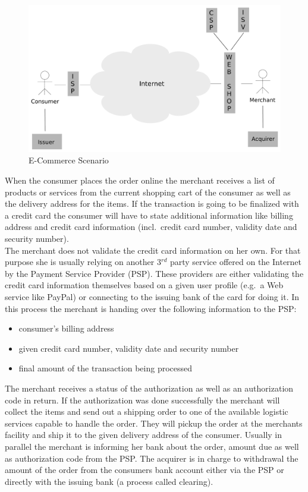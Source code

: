 \begin{figure}[H]
	\centering
		\includegraphics[width=0.8\columnwidth]{images/e-commerce-scenario.pdf}
	\caption{E-Commerce Scenario}
\label{fig:images_ecommerce_scenario}
\end{figure}

When the consumer places the order online the merchant receives a list of products or services from the current shopping cart of the consumer as well as the delivery address for the items. If the transaction is going to be finalized with a credit card the consumer will have to state additional information like billing address and credit card information (incl.\ credit card number, validity date and security number). \\
The merchant does not validate the credit card information on her own. For that purpose she is usually relying on another 3$^{rd}$ party service offered on the Internet by the Payment Service Provider (PSP). These providers are either validating the credit card information themselves based on a given user profile (e.g.\ a Web service like PayPal) or connecting to the issuing bank of the card for doing it. In this process the merchant is handing over the following information to the PSP:\@

\begin{itemize}
    \item consumer's billing address
    \item given credit card number, validity date and security number
    \item final amount of the transaction being processed
\end{itemize}

The merchant receives a status of the authorization as well as an authorization code in return. If the authorization was done successfully the merchant will collect the items and send out a shipping order to one of the available logistic
services capable to handle the order. They will pickup the order at the merchants facility and ship it to the given delivery address of the consumer. Usually in parallel the merchant is informing her bank about the order, amount due as well as
authorization code from the PSP. The acquirer is in charge to withdrawal the amount of the order from the consumers bank account either via the PSP or directly with the issuing bank (a process called clearing).\@

